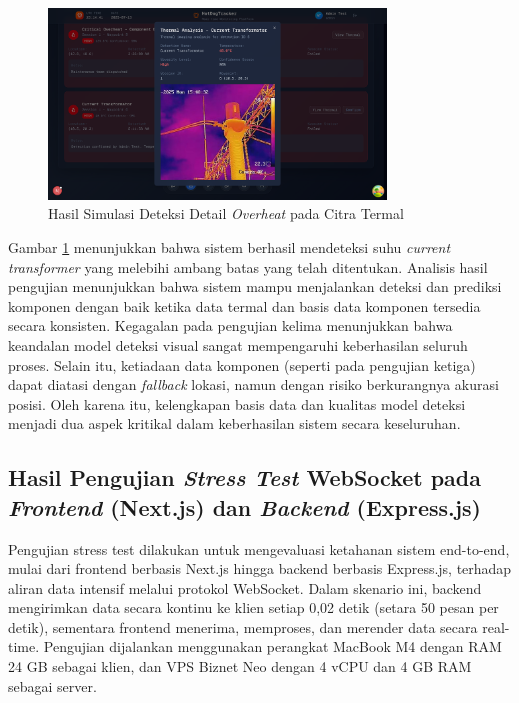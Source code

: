     \begin{figure}[H]
        \centering
        \includegraphics[width=0.8\textwidth]{gambar/bab4/webview.png}
        \caption{Hasil Simulasi Deteksi Detail \emph{Overheat} pada Citra Termal}
        \label{fig:simulasi_overheat_detail}
        \end{figure}
    

	Gambar \ref{fig:simulasi_overheat_detail} menunjukkan bahwa sistem berhasil mendeteksi suhu \emph{current transformer} yang melebihi ambang batas yang telah ditentukan. Analisis hasil pengujian menunjukkan bahwa sistem mampu menjalankan deteksi dan prediksi komponen dengan baik ketika data termal dan basis data komponen tersedia secara konsisten. Kegagalan pada pengujian kelima menunjukkan bahwa keandalan model deteksi visual sangat mempengaruhi keberhasilan seluruh proses. Selain itu, ketiadaan data komponen (seperti pada pengujian ketiga) dapat diatasi dengan \emph{fallback} lokasi, namun dengan risiko berkurangnya akurasi posisi. Oleh karena itu, kelengkapan basis data dan kualitas model deteksi menjadi dua aspek kritikal dalam keberhasilan sistem secara keseluruhan.


    \subsection{Hasil Pengujian \textit{Stress Test} WebSocket pada \textit{Frontend} (Next.js) dan \textit{Backend} (Express.js)}

    Pengujian stress test dilakukan untuk mengevaluasi ketahanan sistem end-to-end, mulai dari frontend berbasis Next.js hingga backend berbasis Express.js, terhadap aliran data intensif melalui protokol WebSocket. Dalam skenario ini, backend mengirimkan data secara kontinu ke klien setiap 0,02 detik (setara 50 pesan per detik), sementara frontend menerima, memproses, dan merender data secara real-time. Pengujian dijalankan menggunakan perangkat MacBook M4 dengan RAM 24 GB sebagai klien, dan VPS Biznet Neo dengan 4 vCPU dan 4 GB RAM sebagai server.
    
